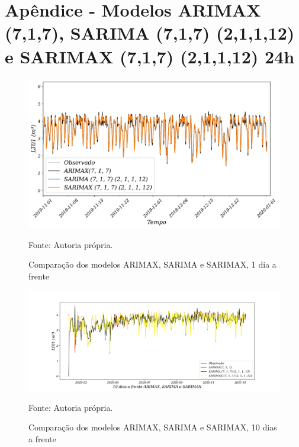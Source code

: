 
\section{Ap\^endice - Modelos ARIMAX (7,1,7), SARIMA (7,1,7) (2,1,1,12) e SARIMAX (7,1,7) (2,1,1,12) 24h}\label{sec:arimaxsarimasarimax24}

\begin{figure}[H]
	\centering
	\caption{Comparação dos modelos ARIMAX, SARIMA e SARIMAX, 1 dia a frente }
	\label{fig:1-ARIMAX-SARIMA-SARIMAX24}
	\includegraphics[width=1\linewidth]{Apendices/Figuras/modelagem-24h/1-ARIMAX-SARIMA-SARIMAX}
	
	Fonte: Autoria própria.
\end{figure}

\begin{figure}[H]
	\centering
	\caption{Comparação dos modelos ARIMAX, SARIMA e SARIMAX, 10 dias a frente }
	\label{fig:10-ARIMAX-SARIMA-SARIMAX24}
	\includegraphics[width=1\linewidth]{Apendices/Figuras/modelagem-24h/10-ARIMAX-SARIMA-SARIMAX}
	
	Fonte: Autoria própria.
\end{figure}


